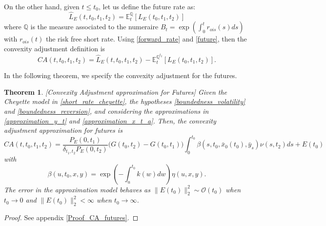 \documentclass[a4paper,10pt]{article}
\newtheorem{theorem}{Theorem}[section]
\newcommand{\1}{\mathbf{1}}
\begin{document}
On the other hand, given $t\leq t_{0}$, let us define the future rate as:    
\begin{equation}\label{future}
\hat{L}_{E}(t,t_0, t_1, t_2) = \mathbb{E}_t^{\mathbb{Q}}\left[L_{E}(t_0, t_1, t_2) \right]
\end{equation}
where $\mathbb{Q}$ is the measure associated to the numeraire $B_t=\exp\left(\int_{0}^{t} r_{ois}(s) ds \right)$ with $ r_{ois}(t)$ the risk free short rate. Using
\eqref{forward_rate} and \eqref{future}, then the convexity adjustment definition is
\begin{equation*}
CA(t, t_0, t_1, t_2) = \hat{L}_{E}(t,t_0, t_1, t_2) - \mathbb{E}_t^{\mathbb{Q}^{t_2}}\left[L_{E}(t_0, t_1, t_2) \right].
\end{equation*}

In the following theorem, we specify the convexity adjustment for the futures.

\begin{theorem}\label{Th_CA_futures}[Convexity Adjustment approximation for Futures]
Given the Cheyette model in \eqref{short_rate_cheyette}, the hypotheses \ref{boundedness_volatility} and \ref{boundedness_reversion}, and considering the approximations in \eqref{approximation_y_t} and \eqref{approximation_x_t_a}. Then, the convexity adjustment approximation for futures is 
\begin{equation}\label{ca_approximation_futures}
CA(t,t_0,t_1, t_2) = \frac{P_{E}(0,t_1)}{\delta_{t_1,t_2} P_{E}(0,t_2)} \biggl(G(t_0,t_2)  - G(t_0,t_1) \biggr) \int_{0}^{t_0} \beta(s,t_0,\bar{x}_0(t_0),\bar{y}_s) \nu(s,t_2) ds + E(t_0)
\end{equation}
with 
\begin{equation*}
\beta(u,t_0,x,y) = \exp\left(-\int_{u}^{t_0}k(w) dw \right) \eta(u,x,y).
\end{equation*}
The error in the approximation model behaves as $\|E\left(t_0\right)\|^{2}_{2} \sim \mathcal{O}(t_0)$ when $t_0 \to 0$ and $\|E\left(t_0\right)\|^{2}_{2} < \infty$ when $t_0 \to \infty$. 
\end{theorem}
\begin{proof}
See appendix \ref{Proof_CA_futures}.
\end{proof}
\end{document}
